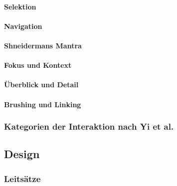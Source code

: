                 \paragraph{Selektion} %

                \paragraph{Navigation} %

                \paragraph{Shneidermans Mantra} %

                \paragraph{Fokus und Kontext} %

                \paragraph{Überblick und Detail} %

                \paragraph{Brushing und Linking} %

            \subsubsection{Kategorien der Interaktion nach Yi et al.} %

        \subsection{Design} %

            \subsubsection{Leitsätze} %

